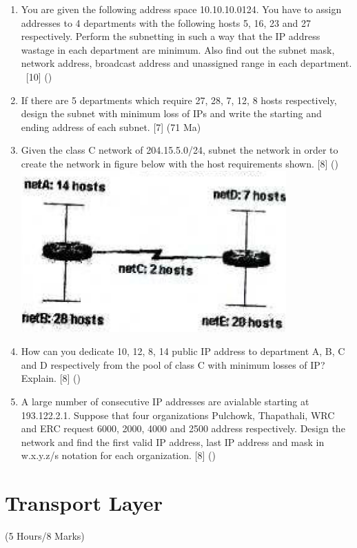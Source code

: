 \documentclass[12pt]{article}
\newcommand{\enter}{\\\textcolor{white}{1}}
\begin{document}
\begin{enumerate}
			\item You are given the following address space 10.10.10.0124. You have to assign addresses to 4 departments with the following hosts 5, 16, 23 and 27 respectively. Perform the subnetting in such a way that the IP address wastage in each department are minimum. Also find out the subnet mask, network address, broadcast address and unassigned range in each department.
			\enter\hfill [10] ()

			\item If there are 5 departments which require 27, 28, 7, 12, 8 hosts respectively, design the subnet with minimum loss of IPs and write the starting and ending address of each subnet. \hfill [7] (71 Ma)

			\item Given the class C network of 204.15.5.0/24, subnet the network in order to create the network in figure below with the host requirements shown. \hfill [8] ()\\
			\includegraphics[width=4in]{cn_1}

			\item How can you dedicate 10, 12, 8, 14 public IP address to department A, B, C and D respectively from the pool of class C with minimum losses of IP? Explain. \hfill [8] ()

			\item A large number of consecutive IP addresses are avialable starting at 193.122.2.1. Suppose that four organizations Pulchowk, Thapathali, WRC and ERC request 6000, 2000, 4000 and 2500 address respectively. Design the network and find the first valid IP address, last IP address and mask in w.x.y.z/s notation for each organization. \hfill [8] ()
		\end{enumerate}

	\pagebreak

\section{Transport Layer}
	\begin{center}(5 Hours/8 Marks)\end{center}
\end{document}
